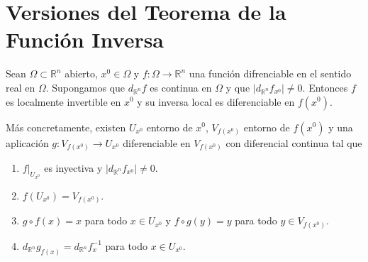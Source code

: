 \section{Versiones del Teorema de la Función Inversa}

\begin{teo}
    Sean $\Omega \subset \mathbb{R}^n$ abierto, $x^0 \in \Omega$ y $f : \Omega \longrightarrow \mathbb{R}^n$ una función difrenciable en el sentido real en $\Omega$. Supongamos que $d_{\mathbb{R}^n}f$ es continua en $\Omega$ y que $|d_{\mathbb{R}^n}f_{x^0}| \not = 0$. Entonces $f$ es localmente invertible en $x^0$ y su inversa local es diferenciable en $f(x^0)$.

    Más concretamente, existen $U_{x^0}$ entorno de $x^0$, $V_{f(x^0)}$ entorno de $f(x^0)$ y una aplicación $g : V_{f(x^0)} \longrightarrow U_{x^0}$ diferenciable en $V_{f(x^0)}$ con diferencial continua tal que
    \begin{enumerate}
        \item $f|_{U_{x^0}}$ es inyectiva y $|d_{\mathbb{R}^n}f_{x^0}| \not = 0$.
        \item $f(U_{x^0}) = V_{f(x^0)}$.
        \item $g \circ f (x) = x$ para todo $x \in U_{x^0}$ y $f \circ g (y) = y$ para todo $y \in V_{f(x^0)}$.
        \item $d_{\mathbb{R}^n}g_{f(x)} = d_{\mathbb{R}^n}f_{x}^{-1}$ para todo $x \in U_{x^0}$.
    \end{enumerate}
\end{teo}

